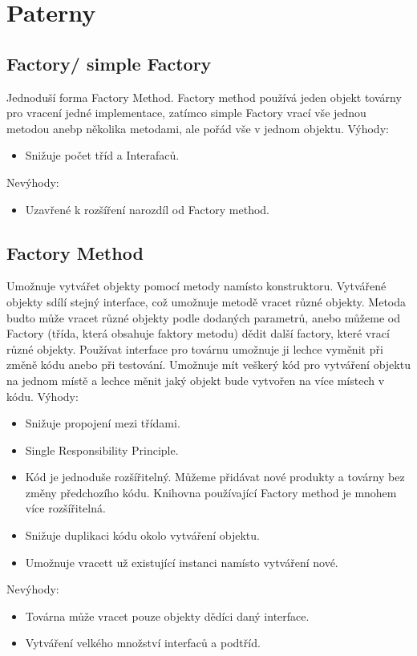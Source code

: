 \documentclass{article}
\begin{document}
\section{Paterny}
\subsection{Factory/ simple Factory}
Jednoduší forma Factory Method. Factory method používá jeden objekt továrny pro vracení jedné implementace, zatímco
simple Factory vrací vše jednou metodou anebp několika metodami, ale pořád vše v jednom objektu.
 Výhody:
\begin{itemize}
  \item Snižuje počet tříd a Interafaců.
\end{itemize}
Nevýhody:
\begin{itemize}
  \item Uzavřené k rozšíření narozdíl od Factory method.
\end{itemize}

\subsection{Factory Method}\label{Factory Method}
Umožnuje vytvářet objekty pomocí metody namísto konstruktoru. Vytvářené objekty sdílí stejný interface, 
což umožnuje metodě vracet různé objekty. Metoda budto může vracet různé objekty podle dodaných parametrů, anebo můžeme od Factory (třída, která obsahuje faktory metodu)
dědit další factory, které vrací různé objekty. Používat interface pro továrnu umožnuje ji lechce vyměnit při změně kódu anebo při testování.
Umožnuje mít veškerý kód pro vytváření objektu na jednom místě a lechce měnit jaký objekt bude vytvořen na více místech v kódu.
\medskip \newline %
Výhody:
\begin{itemize}
  \item Snižuje propojení mezi třídami.
  \item Single Responsibility Principle.
  \item Kód je jednoduše rozšířitelný. Můžeme přidávat nové produkty a továrny bez změny předchozího kódu. Knihovna používající Factory method je mnohem více rozšířitelná.
  \item Snižuje duplikaci kódu okolo vytváření objektu.
  \item Umožnuje vracett už existující instanci namísto vytváření nové.
\end{itemize}
Nevýhody:
\begin{itemize}
  \item Továrna může vracet pouze objekty dědíci daný interface.
  \item Vytváření velkého množství interfaců a podtříd.
\end{itemize}
\medskip
\end{document}
